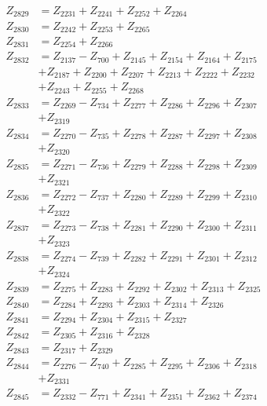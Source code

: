 \begin{multicols}{2}
\begin{align}
Z_{2829} &= Z_{2231} + Z_{2241} + Z_{2252} + Z_{2264} \nonumber \\
Z_{2830} &= Z_{2242} + Z_{2253} + Z_{2265} \nonumber \\
Z_{2831} &= Z_{2254} + Z_{2266} \nonumber \\
Z_{2832} &= Z_{2137} - Z_{700} + Z_{2145} + Z_{2154} + Z_{2164} + Z_{2175}  \nonumber \\
&+ Z_{2187} + Z_{2200} + Z_{2207} + Z_{2213} + Z_{2222} + Z_{2232}  \nonumber \\
&+ Z_{2243} + Z_{2255} + Z_{2268} \nonumber \\
Z_{2833} &= Z_{2269} - Z_{734} + Z_{2277} + Z_{2286} + Z_{2296} + Z_{2307}  \nonumber \\
&+ Z_{2319} \nonumber \\
Z_{2834} &= Z_{2270} - Z_{735} + Z_{2278} + Z_{2287} + Z_{2297} + Z_{2308}  \nonumber \\
&+ Z_{2320} \nonumber \\
Z_{2835} &= Z_{2271} - Z_{736} + Z_{2279} + Z_{2288} + Z_{2298} + Z_{2309}  \nonumber \\
&+ Z_{2321} \nonumber \\
Z_{2836} &= Z_{2272} - Z_{737} + Z_{2280} + Z_{2289} + Z_{2299} + Z_{2310}  \nonumber \\
&+ Z_{2322} \nonumber \\
Z_{2837} &= Z_{2273} - Z_{738} + Z_{2281} + Z_{2290} + Z_{2300} + Z_{2311}  \nonumber \\
&+ Z_{2323} \nonumber \\
Z_{2838} &= Z_{2274} - Z_{739} + Z_{2282} + Z_{2291} + Z_{2301} + Z_{2312}  \nonumber \\
&+ Z_{2324} \nonumber \\
Z_{2839} &= Z_{2275} + Z_{2283} + Z_{2292} + Z_{2302} + Z_{2313} + Z_{2325} \nonumber \\
Z_{2840} &= Z_{2284} + Z_{2293} + Z_{2303} + Z_{2314} + Z_{2326} \nonumber \\
Z_{2841} &= Z_{2294} + Z_{2304} + Z_{2315} + Z_{2327} \nonumber \\
Z_{2842} &= Z_{2305} + Z_{2316} + Z_{2328} \nonumber \\
Z_{2843} &= Z_{2317} + Z_{2329} \nonumber \\
Z_{2844} &= Z_{2276} - Z_{740} + Z_{2285} + Z_{2295} + Z_{2306} + Z_{2318}  \nonumber \\
&+ Z_{2331} \nonumber \\
Z_{2845} &= Z_{2332} - Z_{771} + Z_{2341} + Z_{2351} + Z_{2362} + Z_{2374} \nonumber \\

\end{align}
\end{multicols}
